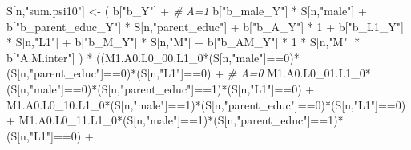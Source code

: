 \documentclass[
]{book}
\newenvironment{Shaded}{\begin{snugshade}}{\end{snugshade}}
\newcommand{\CommentTok}[1]{\textcolor[rgb]{0.56,0.35,0.01}{\textit{#1}}}
\newcommand{\DecValTok}[1]{\textcolor[rgb]{0.00,0.00,0.81}{#1}}
\newcommand{\NormalTok}[1]{#1}
\newcommand{\OtherTok}[1]{\textcolor[rgb]{0.56,0.35,0.01}{#1}}
\newcommand{\SpecialCharTok}[1]{\textcolor[rgb]{0.00,0.00,0.00}{#1}}
\newcommand{\StringTok}[1]{\textcolor[rgb]{0.31,0.60,0.02}{#1}}
\begin{document}
\begin{Shaded}
\begin{Highlighting}[]
\NormalTok{    S[n,}\StringTok{"sum.psi10"}\NormalTok{] }\OtherTok{\textless{}{-}}\NormalTok{  ( b[}\StringTok{"b\_Y"}\NormalTok{] }\SpecialCharTok{+}                                            \CommentTok{\# A=1}
\NormalTok{                             b[}\StringTok{"b\_male\_Y"}\NormalTok{] }\SpecialCharTok{*}\NormalTok{ S[n,}\StringTok{"male"}\NormalTok{] }\SpecialCharTok{+} 
\NormalTok{                             b[}\StringTok{"b\_parent\_educ\_Y"}\NormalTok{] }\SpecialCharTok{*}\NormalTok{ S[n,}\StringTok{"parent\_educ"}\NormalTok{] }\SpecialCharTok{+} 
\NormalTok{                             b[}\StringTok{"b\_A\_Y"}\NormalTok{] }\SpecialCharTok{*} \DecValTok{1} \SpecialCharTok{+} 
\NormalTok{                             b[}\StringTok{"b\_L1\_Y"}\NormalTok{] }\SpecialCharTok{*}\NormalTok{ S[n,}\StringTok{"L1"}\NormalTok{] }\SpecialCharTok{+}
\NormalTok{                             b[}\StringTok{"b\_M\_Y"}\NormalTok{] }\SpecialCharTok{*}\NormalTok{ S[n,}\StringTok{"M"}\NormalTok{] }\SpecialCharTok{+}
\NormalTok{                             b[}\StringTok{"b\_AM\_Y"}\NormalTok{] }\SpecialCharTok{*} \DecValTok{1} \SpecialCharTok{*}\NormalTok{ S[n,}\StringTok{"M"}\NormalTok{] }\SpecialCharTok{*}\NormalTok{ b[}\StringTok{"A.M.inter"}\NormalTok{] ) }\SpecialCharTok{*}
\NormalTok{      ((M1.A0.L0\_00.L1\_0}\SpecialCharTok{*}\NormalTok{(S[n,}\StringTok{"male"}\NormalTok{]}\SpecialCharTok{==}\DecValTok{0}\NormalTok{)}\SpecialCharTok{*}\NormalTok{(S[n,}\StringTok{"parent\_educ"}\NormalTok{]}\SpecialCharTok{==}\DecValTok{0}\NormalTok{)}\SpecialCharTok{*}\NormalTok{(S[n,}\StringTok{"L1"}\NormalTok{]}\SpecialCharTok{==}\DecValTok{0}\NormalTok{) }\SpecialCharTok{+} \CommentTok{\# A\textquotesingle{}=0}
\NormalTok{          M1.A0.L0\_01.L1\_0}\SpecialCharTok{*}\NormalTok{(S[n,}\StringTok{"male"}\NormalTok{]}\SpecialCharTok{==}\DecValTok{0}\NormalTok{)}\SpecialCharTok{*}\NormalTok{(S[n,}\StringTok{"parent\_educ"}\NormalTok{]}\SpecialCharTok{==}\DecValTok{1}\NormalTok{)}\SpecialCharTok{*}\NormalTok{(S[n,}\StringTok{"L1"}\NormalTok{]}\SpecialCharTok{==}\DecValTok{0}\NormalTok{) }\SpecialCharTok{+}
\NormalTok{          M1.A0.L0\_10.L1\_0}\SpecialCharTok{*}\NormalTok{(S[n,}\StringTok{"male"}\NormalTok{]}\SpecialCharTok{==}\DecValTok{1}\NormalTok{)}\SpecialCharTok{*}\NormalTok{(S[n,}\StringTok{"parent\_educ"}\NormalTok{]}\SpecialCharTok{==}\DecValTok{0}\NormalTok{)}\SpecialCharTok{*}\NormalTok{(S[n,}\StringTok{"L1"}\NormalTok{]}\SpecialCharTok{==}\DecValTok{0}\NormalTok{) }\SpecialCharTok{+} 
\NormalTok{          M1.A0.L0\_11.L1\_0}\SpecialCharTok{*}\NormalTok{(S[n,}\StringTok{"male"}\NormalTok{]}\SpecialCharTok{==}\DecValTok{1}\NormalTok{)}\SpecialCharTok{*}\NormalTok{(S[n,}\StringTok{"parent\_educ"}\NormalTok{]}\SpecialCharTok{==}\DecValTok{1}\NormalTok{)}\SpecialCharTok{*}\NormalTok{(S[n,}\StringTok{"L1"}\NormalTok{]}\SpecialCharTok{==}\DecValTok{0}\NormalTok{) }\SpecialCharTok{+}

\end{Highlighting}
\end{Shaded}
\end{document}
